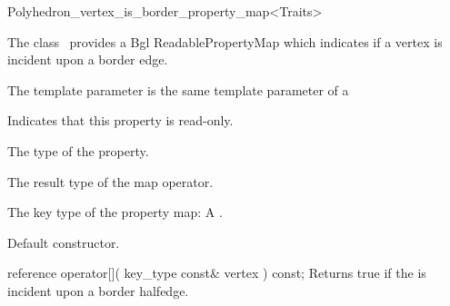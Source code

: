 

\begin{ccRefClass}{Polyhedron_vertex_is_border_property_map<Traits>}


\ccDefinition

The class \ccRefName\ provides a {\sc Bgl}
{ReadablePropertyMap} 
which indicates if a  vertex is incident upon a border edge.

The template parameter  is the same  template parameter 
of a 


\ccTypes
    {Indicates that this property is read-only.}
  
    {The type of the property.}
    
    {The result type of the map operator.}
    
  {The key type of the property map: A .}

\ccCreation
{}  %

{Default constructor.}

\ccOperations

\ccMethod
  {reference operator[]( key_type const& vertex ) const;}
  {Returns true if the  is incident upon a border halfedge.}  
    
\ccIsModel
{} 

\end{ccRefClass}


